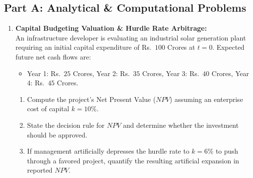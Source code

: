 \subsection*{Part A: Analytical \& Computational Problems}

\begin{enumerate}[label=\textbf{P6.\arabic*}]
    \item \textbf{Capital Budgeting Valuation \& Hurdle Rate Arbitrage:}\\
    An infrastructure developer is evaluating an industrial solar generation plant requiring an initial capital expenditure of Rs.~$100$ Crores at $t = 0$. Expected future net cash flows are:
    \begin{itemize}
        \item Year 1: Rs.~$25$ Crores, Year 2: Rs.~$35$ Crores, Year 3: Rs.~$40$ Crores, Year 4: Rs.~$45$ Crores.
    \end{itemize}
    \begin{enumerate}[label=(\alph*)]
        \item Compute the project's Net Present Value ($NPV$) assuming an enterprise cost of capital $k = 10\%$.
        \item State the decision rule for $NPV$ and determine whether the investment should be approved.
        \item If management artificially depresses the hurdle rate to $k = 6\%$ to push through a favored project, quantify the resulting artificial expansion in reported $NPV$.
    \end{enumerate}


\end{enumerate}
